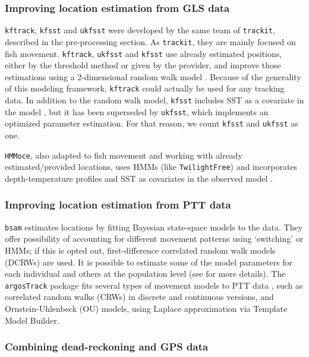 \documentclass[a4paper,12pt]{article}
\newcommand{\Rpkg}[1]{\texttt{#1}}
\begin{document}
\subsubsection*{Improving location estimation from GLS data}

\Rpkg{kftrack}, \Rpkg{kfsst} and \Rpkg{ukfsst} were developed by the same team of \Rpkg{trackit}, described in the pre-processing section. As \Rpkg{trackit}, they are mainly focused on fish movement. \Rpkg{kftrack}, \Rpkg{ukfsst} and \Rpkg{kfsst} use already estimated positions, either by the threshold method or given by the provider, and improve those estimations using a 2-dimensional random walk model \citep{Sibert2003}. Because of the generality of this modeling framework, \Rpkg{kftrack} could actually be used for any tracking data. In addition to the random walk model, \Rpkg{kfsst} includes SST as a covariate in the model \citep{Nielsen2006}, but it has been superseded by \Rpkg{ukfsst}, which implements an optimized parameter estimation. For that reason, we count \Rpkg{kfsst} and \Rpkg{ukfsst} as one.

\Rpkg{HMMoce}, also adapted to fish movement and working with already estimated/provided locations, uses HMMs (like \Rpkg{TwilightFree}) and incorporates depth-temperature profiles and SST as covariates in the observed model \citep{Braun2017}. 

\subsubsection*{Improving location estimation from PTT data}

\Rpkg{bsam} estimates locations by fitting Bayesian state-space models to the data. They offer possibility of accounting for different movement patterns using `switching' or HMMs; if this is opted out, first-difference correlated random walk models (DCRWs) are used. It is possible to estimate some of the model parameters for each individual and others at the population level (see \cite{Jonsen2013,Jonsen2016} for more details). The \Rpkg{argosTrack} package fits several types of movement models to PTT data \citep{Albertsen2015}, such as correlated random walks (CRWs) in discrete and continuous versions, and Ornstein-Uhlenbeck (OU) models, using Laplace approximation via Template Model Builder. 

\subsubsection*{Combining dead-reckoning and GPS data}
\end{document}
